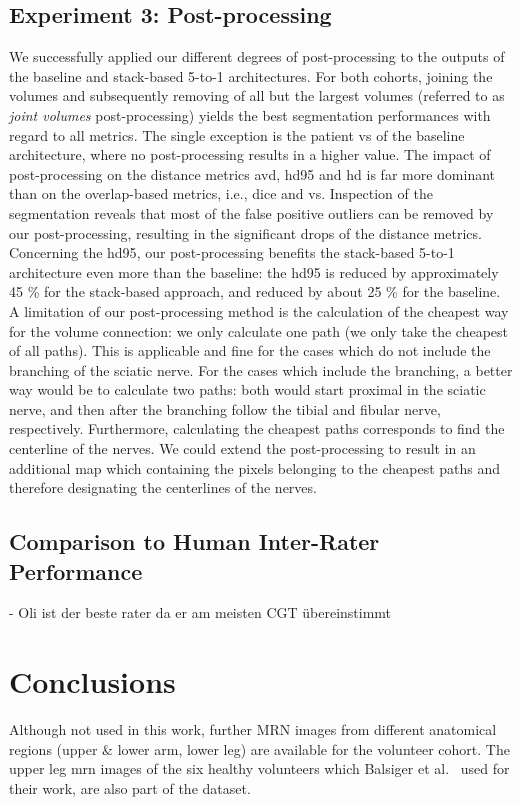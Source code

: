 \subsection{Experiment 3: Post-processing}
We successfully applied our different degrees of post-processing to the outputs of the baseline and stack-based 5-to-1 architectures. For both cohorts, joining the volumes and subsequently removing of all but the largest volumes (referred to as \textit{joint volumes} post-processing) yields the best segmentation performances with regard to all metrics. The single exception is the patient \acrlong{vs} of the baseline architecture, where no post-processing results in a higher value.
The impact of post-processing on the distance metrics \gls{avd}, \gls{hd95} and \gls{hd} is far more dominant than on the overlap-based metrics, i.e., \gls{dice} and \gls{vs}. Inspection of the segmentation reveals that most of the false positive outliers can be removed by our post-processing, resulting in the significant drops of the distance metrics. 
Concerning the \acrlong{hd95}, our post-processing benefits the stack-based 5-to-1 architecture even more than the baseline: the \gls{hd95} is reduced by approximately 45 \% for the stack-based approach, and reduced by about 25 \% for the baseline.
A limitation of our post-processing method is the calculation of the cheapest way for the volume connection: we only calculate one path (we only take the cheapest of all paths). This is applicable and fine for the cases which do not include the branching of the sciatic nerve. For the cases which include the branching, a better way would be to calculate two paths: both would start proximal in the sciatic nerve, and then after the branching follow the tibial and fibular nerve, respectively.
Furthermore, calculating the cheapest paths corresponds to find the centerline of the nerves. We could extend the post-processing to result in an additional map which containing the pixels belonging to the cheapest paths and therefore designating the centerlines of the nerves.

\subsection{Comparison to Human Inter-Rater Performance}
- Oli ist der beste rater da er am meisten CGT übereinstimmt


\section{Conclusions} \label{disc:conclusions}


Although not used in this work, further MRN images from different anatomical regions (upper \& lower arm, lower leg) are available for the volunteer cohort. The upper leg \gls{mrn} images of the six healthy volunteers which Balsiger et al.~\cite{Balsiger2016DevelopmentApproaches} used for their work, are also part of the dataset.\\

\endinput